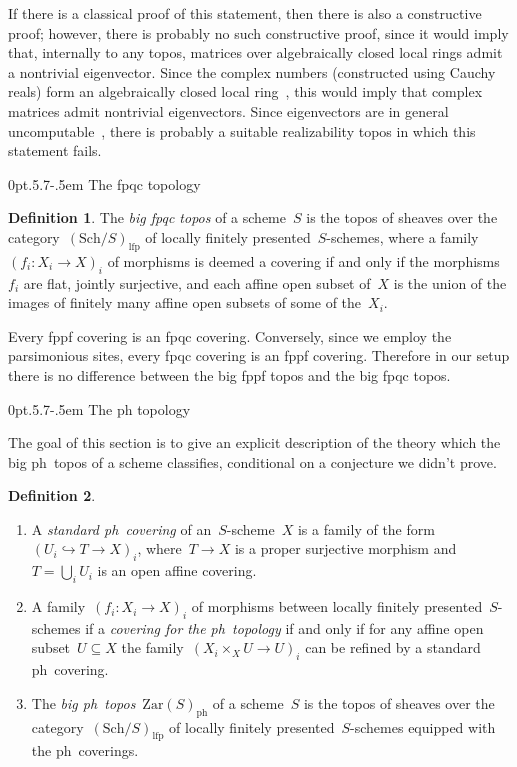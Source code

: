 \documentclass[10pt,reqno,a4paper]{amsbook}
\makeatletter
\theoremstyle{definition}
\newtheorem{defn}{Definition}[section]
\theoremstyle{plain}
\theoremstyle{remark}
\newcommand{\Zar}{\mathrm{Zar}}
\newcommand{\ph}{\mathrm{ph}}
\newcommand{\Sch}{\mathrm{Sch}}
\newcommand{\lfp}{\mathrm{lfp}}
\newcommand{\?}{\,{:}\,}
\renewcommand{\_}{\mathpunct{.}\,}
\def\subsection{\@startsection{subsection}{2}%
  {0pt}{.5\linespacing\@plus.7\linespacing}{-.5em}%
  {\normalfont\bfseries}}
\makeatother
\begin{document}
\begin{itemize}
If there is a classical proof of this statement, then there is also a
constructive proof; however, there is probably no such constructive proof,
since it would imply that, internally to any topos, matrices over
algebraically closed local rings admit a
nontrivial eigenvector. Since the complex numbers (constructed using Cauchy
reals) form an algebraically closed local
ring~\cite[Theorem~3.13]{ruitenburg:roots}, this would imply that complex
matrices admit nontrivial eigenvectors. Since eigenvectors are in general
uncomputable~\cite[Proposition~12]{ziegler:brattka:spectrum}, there is probably
a suitable realizability topos in which this statement fails.
\end{itemize}


\subsection{The fpqc topology}

\begin{defn}The \emph{big fpqc topos} of a scheme~$S$ is the topos of sheaves
over the category~$(\Sch/S)_\lfp$ of locally finitely presented~$S$-schemes, where a
family~$(f_i : X_i \to X)_i$ of morphisms is deemed a covering if and only if
the morphisms~$f_i$ are flat, jointly surjective, and each affine open subset
of~$X$ is the union of the images of finitely many affine open subsets of some of
the~$X_i$.
\end{defn}

Every fppf covering is an fpqc covering. Conversely, since we employ the
parsimonious sites, every fpqc covering is an fppf covering. Therefore in our
setup there is no difference between the big fppf topos and the big fpqc topos.


\subsection{The ph topology}

The goal of this section is to give an explicit description of the theory which
the big ph~topos of a scheme classifies, conditional on a conjecture we
didn't prove.

\begin{defn}\begin{enumerate}
\item A \emph{standard ph~covering} of an~$S$-scheme~$X$ is a family of
the form~$(U_i \hookrightarrow T \to X)_i$, where~$T \to X$ is a proper
surjective morphism and~$T = \bigcup_i U_i$ is an open affine covering.
\item A family~$(f_i : X_i \to X)_i$ of morphisms between locally finitely
presented~$S$-schemes if a \emph{covering for the ph~topology} if and
only if for any affine open subset~$U \subseteq X$ the family~$(X_i \times_X U
\to U)_i$ can be refined by a standard ph~covering.
\item The \emph{big ph~topos}~$\Zar(S)_\ph$ of a scheme~$S$ is the topos of
sheaves over the category~$(\Sch/S)_\lfp$ of locally finitely
presented~$S$-schemes equipped with the ph~coverings.
\end{enumerate}
\end{defn}
\end{document}
